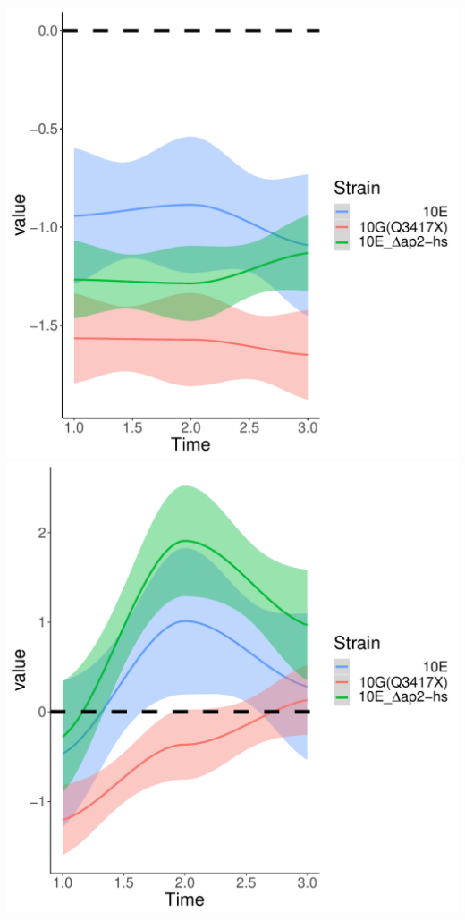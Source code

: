 \documentclass{article}\usepackage[]{graphicx}\usepackage[]{color}
\newenvironment{knitrout}{}{} %
\begin{document}
\begin{knitrout}
{\includegraphics[width=1\linewidth]{figure/minimal-clust_exp-5} 
\includegraphics[width=1\linewidth]{figure/minimal-clust_exp-6} 

}



\end{knitrout}
\end{document}
